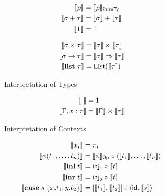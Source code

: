\begin{figure}
  \begin{subfigure}[t]{0.55\linewidth}
    \begin{minipage}{0.55\linewidth}
    \small
    \begin{align*}
      \llbracket \rho \rrbracket &= \llbracket \rho \rrbracket_{\mathsf{PrimTy}}
      \\
      \llbracket \sigma + \tau \rrbracket &= \textstyle {\llbracket \sigma \rrbracket} + {\llbracket \tau \rrbracket}
      \\
      \llbracket \mathbf{1} \rrbracket &= 1
    \end{align*}
  \end{minipage}
    \begin{minipage}{0.4\linewidth}
    \small
    \begin{align*}
      \llbracket \sigma \times \tau \rrbracket &= \llbracket \sigma \rrbracket \times \llbracket \tau \rrbracket
      \\
      \llbracket \sigma \to \tau \rrbracket &= \llbracket \sigma \rrbracket \Rightarrow \llbracket \tau \rrbracket
      \\
      \llbracket \mathbf{list}\;\tau \rrbracket &= \mathrm{List}(\llbracket \tau \rrbracket)
    \end{align*}
    \end{minipage}
    \caption{Interpretation of Types}
    \label{fig:semantics:types}
  \end{subfigure}
  \begin{subfigure}[t]{0.4\linewidth}
    \small
    \begin{align*}
      \llbracket \cdot \rrbracket &= 1
      \\
      \llbracket \Gamma, x: \tau \rrbracket &= \llbracket \Gamma \rrbracket \times \llbracket \tau \rrbracket
    \end{align*}
    \caption{Interpretation of Contexts}
    \label{fig:semantics:contexts}
\end{subfigure}
\begin{subfigure}{0.8\linewidth}
  \begin{minipage}{0.5\linewidth}
  \small
  \begin{align*}
  \sem{x_i} &= \pi_i
  \\
  \sem{\phi(t_1, \ldots, t_n)}
  &=
  \sem{\phi}_{\Op} \comp \prodM{\sem{t_1}}{\ldots, \sem{t_n}}
  \\
  \sem{\tmInl{t}} &= \mathsf{inj}_1 \comp \sem{t}
  \\
  \sem{\tmInr{t}} &= \mathsf{inj}_2 \comp \sem{t}
  \\
  \sem{\tmCase{s}{x}{t_1}{y}{t_2}} &= \coprodM{\sem{t_1}}{\sem{t_2}} \comp \prodM{\id}{\sem{s}}
  \\

\end{align*}
\end{minipage}
\end{subfigure}
\end{figure}
